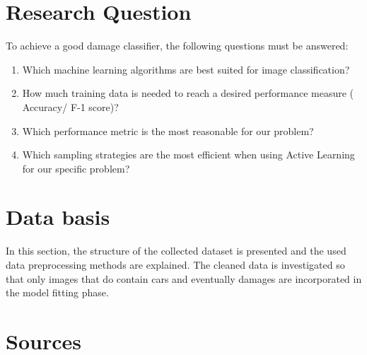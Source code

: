 \documentclass[lang=english,inputenc=utf8,fontsize=10pt]{ldvarticle}
\begin{document}
\section*{Research Question}
To achieve a good damage classifier, the following questions must be answered:
\begin{enumerate}
	\item Which machine learning algorithms are best suited for image classification?
	\item How much training data is needed to reach a desired performance measure ( Accuracy/ F-1 score)?
	\item Which performance metric is the most reasonable for our problem? 
	\item Which sampling strategies are the most efficient when using Active Learning for our specific problem?

	
\end{enumerate}

\newpage

\section{Data basis}

In this section, the structure of the collected dataset is presented and the used data preprocessing methods are explained. The cleaned data is investigated so that only images that do contain cars and eventually damages are incorporated in the model fitting phase.

\section*{Sources}
\end{document}
